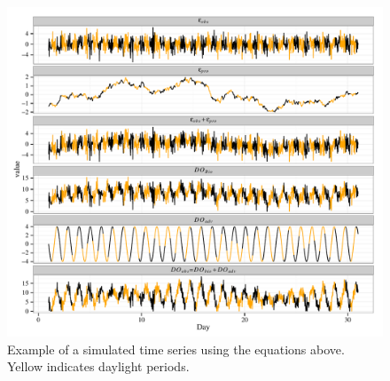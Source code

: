 \documentclass{article}\usepackage[]{graphicx}\usepackage[]{color}
\makeatletter
\def\maxwidth{ %
  \ifdim\Gin@nat@width>\linewidth
    \linewidth
  \else
    \Gin@nat@width
  \fi
}
\newenvironment{knitrout}{}{} %
\makeatother
\begin{document}

\begin{knitrout}
\color{fgcolor}\begin{figure}[!h]


{\centering \includegraphics[width=\maxwidth]{figure/do_sim} 

}

\caption[Example of a simulated time series using the equations above]{Example of a simulated time series using the equations above.  Yellow indicates daylight periods.\label{fig:do_sim}}
\end{figure}


\end{knitrout}
\clearpage

\end{document}

